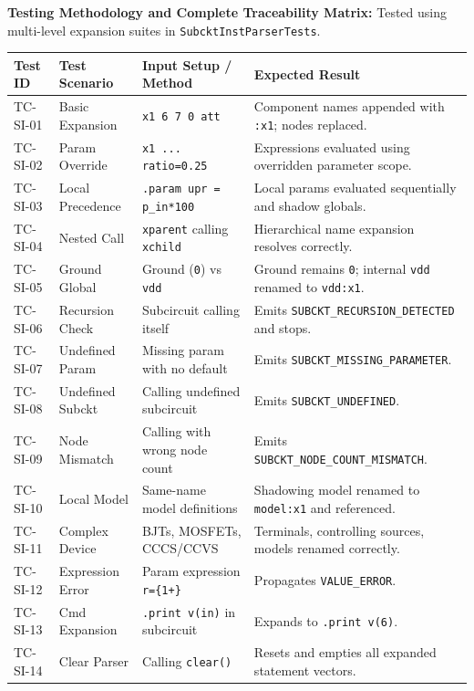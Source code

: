 \textbf{Testing Methodology and Complete Traceability Matrix:} Tested using multi-level expansion suites in \texttt{SubcktInstParserTests}.
\newpage
\begin{table}[H]
\centering
\small
\begin{tabular}{|l|l|p{4.5cm}|p{4.5cm}|}
\hline
\textbf{Test ID} & \textbf{Test Scenario} & \textbf{Input Setup / Method} & \textbf{Expected Result} \\
\hline
TC-SI-01 & Basic Expansion & \texttt{x1 6 7 0 att} & Component names appended with \texttt{:x1}; nodes replaced. \\
\hline
TC-SI-02 & Param Override & \texttt{x1 ... ratio=0.25} & Expressions evaluated using overridden parameter scope. \\
\hline
TC-SI-03 & Local Precedence & \texttt{.param upr = p\_in*100} & Local params evaluated sequentially and shadow globals. \\
\hline
TC-SI-04 & Nested Call & \texttt{xparent} calling \texttt{xchild} & Hierarchical name expansion resolves correctly. \\
\hline
TC-SI-05 & Ground Global & Ground (\texttt{0}) vs \texttt{vdd} & Ground remains \texttt{0}; internal \texttt{vdd} renamed to \texttt{vdd:x1}. \\
\hline
TC-SI-06 & Recursion Check & Subcircuit calling itself & Emits \texttt{SUBCKT\_RECURSION\_DETECTED} and stops. \\
\hline
TC-SI-07 & Undefined Param & Missing param with no default & Emits \texttt{SUBCKT\_MISSING\_PARAMETER}. \\
\hline
TC-SI-08 & Undefined Subckt & Calling undefined subcircuit & Emits \texttt{SUBCKT\_UNDEFINED}. \\
\hline
TC-SI-09 & Node Mismatch & Calling with wrong node count & Emits \texttt{SUBCKT\_NODE\_COUNT\_MISMATCH}. \\
\hline
TC-SI-10 & Local Model & Same-name model definitions & Shadowing model renamed to \texttt{model:x1} and referenced. \\
\hline
TC-SI-11 & Complex Device & BJTs, MOSFETs, CCCS/CCVS & Terminals, controlling sources, models renamed correctly. \\
\hline
TC-SI-12 & Expression Error & Param expression \texttt{r=\{1+\}} & Propagates \texttt{VALUE\_ERROR}. \\
\hline
TC-SI-13 & Cmd Expansion & \texttt{.print v(in)} in subcircuit & Expands to \texttt{.print v(6)}. \\
\hline
TC-SI-14 & Clear Parser & Calling \texttt{clear()} & Resets and empties all expanded statement vectors. \\

\end{tabular}
\end{table}
